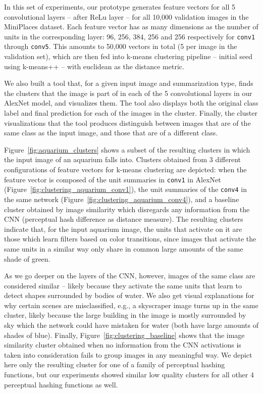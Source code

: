 In this set of experiments, our prototype generates feature vectors for all 5 convolutional layers -- after ReLu layer -- for all 10,000 validation images in the MiniPlaces dataset.  Each feature vector has as many dimensions as the number of units in the corresponding layer: 96, 256, 384, 256 and 256 respectively for \texttt{conv1} through \texttt{conv5}. This amounts to 50,000 vectors in total (5 per image in the validation set), which are then fed into k-means clustering pipeline -- initial seed using k-means++ -- with euclidean as the distance metric.

We also built a tool that, for a given input image and summarization type, finds the clusters that the image is part of in each of the 5 convolutional layers in our AlexNet model, and visualizes them.  The tool also displays both the original class label and final prediction for each of the images in the cluster.  Finally, the cluster visualizations that the tool produces distinguish between images that are of the same class as the input image, and those that are of a different class.

Figure~\ref{fig:aquarium_clusters} shows a subset of the resulting clusters in which the input image of an aquarium falls into.  Clusters obtained from 3 different configurations of feature vectors for k-means clustering are depicted: when the feature vector is composed of the unit summaries in \texttt{conv1} in AlexNet (Figure~\ref{fig:clustering_aquarium_conv1}), the unit summaries of the \texttt{conv4} in the same network (Figure~\ref{fig:clustering_aquarium_conv4}), and a baseline cluster obtained by image similarity which disregards any information from the CNN (perceptual hash difference as distance measure).  The resulting clusters indicate that, for the input aquarium image, the units that activate on it are those which learn filters based on color transitions, since images that activate the same units in a similar way only share in common large amounts of the same shade of green.

As we go deeper on the layers of the CNN, however, images of the same class are considered similar -- likely because they activate the same units that learn to detect shapes surrounded by bodies of water.  We also get visual explanations for why certain scenes are misclassified, e.g., a skyscraper image turns up in the same cluster, likely because the large building in the image is mostly surrounded by sky which the network could have mistaken for water (both have large amounts of shades of blue).  Finally, Figure~\ref{fig:clustering_baseline} shows that the image similarity cluster obtained when no information from the CNN activations is taken into consideration fails to group images in any meaningful way.  We depict here only the resulting cluster for one of a family of perceptual hashing~\cite{phash_benchmark,imagehash} functions, but our experiments showed similar low quality clusters for all other 4 perceptual hashing functions as well.

